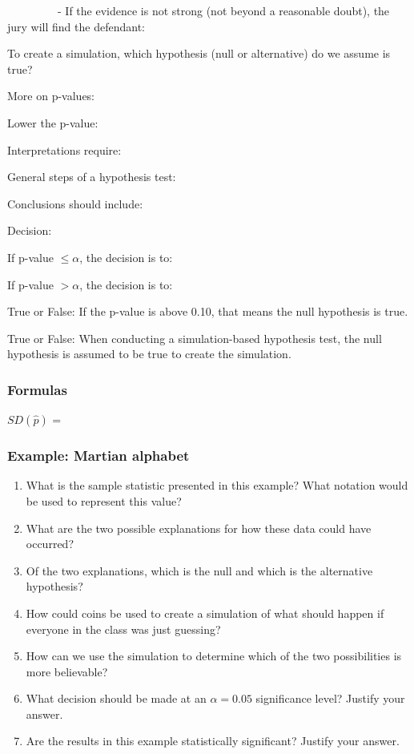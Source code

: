 \documentclass[
]{report}
\newcommand{\rgs}{\vspace{12pt}} %
\newcommand{\rgi}{\hspace{24pt}}  %
\begin{document}
\rgs

~~~~~~~~~- If the evidence is not strong (not beyond a reasonable doubt), the jury will find the defendant:

\rgs

To create a simulation, which hypothesis (null or alternative) do we assume is true?
\rgs

More on p-values:

\rgi Lower the p-value:
\rgs

\rgi Interpretations require:
\rgs

General steps of a hypothesis test:
\rgs

Conclusions should include:
\rgs

Decision:

\rgi If p-value \(\leq \alpha\), the decision is to:

\rgi If p-value \(> \alpha\), the decision is to:

\newpage

True or False: If the p-value is above 0.10, that means the null hypothesis is true.

True or False: When conducting a simulation-based hypothesis test, the null hypothesis is assumed to be true to create the simulation.

\hypertarget{formulas}{%
\subsubsection*{Formulas}\label{formulas}}

\(SD(\hat{p})\) =
\rgs

\hypertarget{example-martian-alphabet}{%
\subsubsection*{Example: Martian alphabet}\label{example-martian-alphabet}}

\begin{enumerate}
\def\labelenumi{\arabic{enumi}.}
\item
  What is the sample statistic presented in this example? What notation would be used to represent this value?
  \rgs
\item
  What are the two possible explanations for how these data could have occurred?
  \rgs
  \rgs
\item
  Of the two explanations, which is the null and which is the alternative hypothesis?
  \rgs
\item
  How could coins be used to create a simulation of what should happen if everyone in the class was just guessing?
  \rgs
  \rgs
  \rgs
\item
  How can we use the simulation to determine which of the two possibilities is more believable?
  \rgs
  \rgs
\item
  What decision should be made at an \(\alpha = 0.05\) significance level? Justify your answer.
  \rgs
\item
  Are the results in this example statistically significant? Justify your answer.
  \rgs
\end{enumerate}
\end{document}
